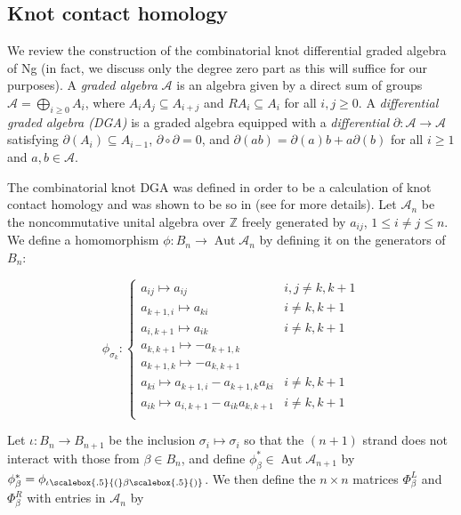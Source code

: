 \documentclass[11pt]{amsart}
\def\Z{{\mathbb Z}}
\def\A{{\mathcal A}}
\def\s{{\sigma}}
\newcommand*{\subsmallp}[1]{\scalebox{.5}{\ensuremath#1}}
\newcommand\Aut{\operatorname{Aut}}
\theoremstyle{definition}
\begin{document}
\subsection{Knot contact homology}
\label{SecBG_KCHdef}



  We review the construction of the combinatorial knot differential graded algebra of Ng (in fact, we discuss only the degree zero part as this will suffice for our purposes).  A \emph{graded algebra} $\A$ is an algebra given by a direct sum of groups $\A = \bigoplus_{i\ge 0} A_i$, where $A_iA_j\subseteq A_{i+j}$ and $RA_i\subseteq A_i$ for all $i,j\ge 0$.  A \emph{differential graded algebra (DGA)} is a graded algebra equipped with a \emph{differential} $\partial\colon \A\rightarrow \A$ satisfying $\partial(A_i)\subseteq A_{i-1}$, $\partial\circ\partial = 0$, and $\partial(ab) = \partial(a)b + a\partial(b)$ for all $i\ge 1$ and $a,b\in \A$.
  
  The combinatorial knot DGA was defined in order to be a calculation of knot contact homology and was shown to be so in \cite{EENS12} (see \cite{Ng12} for more details). Let $\A_n$ be the noncommutative unital algebra over $\Z$ freely generated by $a_{ij}$, $1\le i\ne j\le n$. We define a homomorphism $\phi : B_n \rightarrow\Aut \A_n$ by defining it on the generators of $B_n$:

  \begin{equation}
  \phi_{\s_k}\colon
  \left\{
       \begin{array}{lr}
         a_{ij}\mapsto a_{ij} & i,j\ne k,k+1\\
         a_{k+1,i}\mapsto a_{ki} & i\ne k,k+1\\
         a_{i,k+1}\mapsto a_{ik} & i\ne k,k+1\\
         a_{k,k+1}\mapsto -a_{k+1,k} & \\
         a_{k+1,k}\mapsto -a_{k,k+1} & \\
         a_{ki}\mapsto a_{k+1,i} - a_{k+1,k}a_{ki} & i\ne k,k+1\\
         a_{ik}\mapsto a_{i,k+1} - a_{ik}a_{k,k+1} & i\ne k,k+1\\
       \end{array}
  \right.
  \label{DefnPhiMap}
  \end{equation}

  Let $\iota\colon B_n \rightarrow B_{n+1}$ be the inclusion $\s_i\mapsto\s_i$ so that the $(n+1)$ strand does not interact with those from $\beta\in B_n$, and define $\phi_\beta^*\in \Aut \A_{n+1}$ by $\phi_\beta^* = \phi_{\iota\subsmallp(\beta\subsmallp)}$. We then define the $n\times n$ matrices $\Phi_\beta^L$ and $\Phi_\beta^R$ with entries in $\A_n$ by
\end{document}
